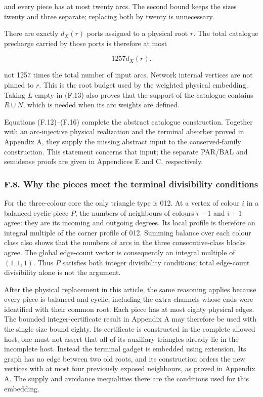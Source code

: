 \documentclass[english,11pt,a4paper]{article}
\begin{document}
and every piece has at most twenty arcs. The second bound keeps the sizes twenty and three separate; replacing both by twenty is unnecessary.

There are exactly \(d_{X}(r)\) ports assigned to a physical root \(r\). The total catalogue precharge carried by those ports is therefore at most

\[1257d_X(r).\tag{F.16}\]

not 1257 times the total number of input arcs. Network internal vertices are not pinned to \(r\). This is the root budget used by the weighted physical embedding. Taking \(L\) empty in (F.13) also proves that the support of the catalogue contains \(R\cup N\), which is needed when its arc weights are defined.

Equations (F.12)--(F.16) complete the abstract catalogue construction. Together with an arc-injective physical realization and the terminal absorber proved in Appendix A, they supply the missing abstract input to the conserved-family construction. This statement concerns that input; the separate PAR/BAL and semidense proofs are given in Appendices E and C, respectively.

\subsubsection{F.8. Why the pieces meet the terminal divisibility conditions}\label{f.8.-why-the-pieces-meet-the-terminal-divisibility-conditions}

For the three-colour core the only triangle type is 012. At a vertex of colour \(i\) in a balanced cyclic piece \(P\), the numbers of neighbours of colours \(i-1\) and \(i+1\) agree: they are its incoming and outgoing degrees. Its local profile is therefore an integral multiple of the corner profile of 012. Summing balance over each colour class also shows that the numbers of arcs in the three consecutive-class blocks agree. The global edge-count vector is consequently an integral multiple of \((1,1,1)\). Thus \(P\) satisfies both integer divisibility conditions; total edge-count divisibility alone is not the argument.

After the physical replacement in this article, the same reasoning applies because every piece is balanced and cyclic, including the extra channels whose ends were identified with their common root. Each piece has at most eighty physical edges. The bounded integer-certificate result in Appendix A may therefore be used with the single size bound eighty. Its certificate is constructed in the complete allowed host; one must not assert that all of its auxiliary triangles already lie in the incomplete host. Instead the terminal gadget is embedded using extension. Its graph has no edge between two old roots, and its construction orders the new vertices with at most four previously exposed neighbours, as proved in Appendix A. The supply and avoidance inequalities there are the conditions used for this embedding.
\end{document}
